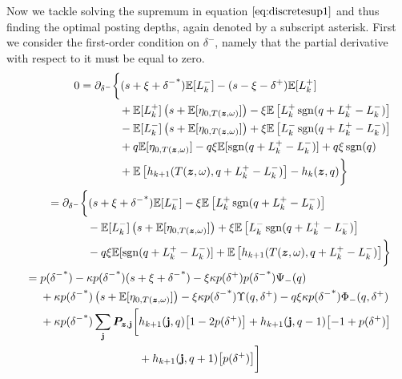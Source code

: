 Now we tackle solving the supremum in equation $\ref{eq:discretesup1}$ and thus finding the optimal posting depths, again denoted by a subscript asterisk. First we consider the first-order condition on $\delta^-$, namely that the partial derivative with respect to it must be equal to zero.
\begin{align}
\begin{split}
0 & = \partial_{\delta^-} \biggl\lbrace 
(s + \xi + {\delta^-}^*)\E [L_k^-] - (s - \xi - \delta^+)\E[L_k^+] \\
& \hphantom{\partial_{\delta^-} \biggl\lbrace {}+{}} + \E[L_k^+] \left( s + \E[\eta_{0,T(\bz, \omega)}] \right)  - \xi \E \left[L_k^+ \sgn( q + L_k^+ - L_k^-) \right] \\
& \hphantom{\partial_{\delta^-} \biggl\lbrace {}+{}} - \E[L_k^-] \left( s + \E[\eta_{0,T(\bz, \omega)}] \right) + \xi \E \left[ L_k^- \sgn( q + L_k^+ - L_k^-) \right] \\
& \hphantom{\partial_{\delta^-} \biggl\lbrace {}+{}} + q \E[ \eta_{0,T(\bz, \omega)}]  - q \xi \E[ \sgn( q + L_k^+ - L_k^-)] + q \xi \sgn(q)  \\
& \hphantom{\partial_{\delta^-} \biggl\lbrace {}+{}} + \E \left[ h_{k+1}(T(\bz,\omega), q + L_k^+ - L_k^- ) \right] -  h_k(\bz,q) \biggr\rbrace
\end{split} \\
\begin{split}
& = \partial_{\delta^-} \biggl\lbrace 
(s + \xi + {\delta^-}^*)\E [L_k^-] - \xi \E \left[L_k^+ \sgn( q + L_k^+ - L_k^-) \right] \\
& \hphantom{\partial_{\delta^-} \biggl\lbrace {}+{}} - \E[L_k^-] \left( s + \E[\eta_{0,T(\bz, \omega)}] \right) + \xi \E \left[ L_k^- \sgn( q + L_k^+ - L_k^-) \right] \\
& \hphantom{\partial_{\delta^-} \biggl\lbrace {}+{}} - q \xi \E[ \sgn( q + L_k^+ - L_k^-)]  + \E \left[ h_{k+1}(T(\bz,\omega), q + L_k^+ - L_k^- ) \right]  \biggr\rbrace
\end{split} \\
\begin{split}
& = p({\delta^-}^*) - \kappa p({\delta^-}^*) (s + \xi + {\delta^-}^*) - \xi \kappa p(\delta^+)p({\delta^-}^*)\Psi_-(q) \\
& \hphantom{{}={}} + \kappa p({\delta^-}^*) \left( s + \E[\eta_{0,T(\bz, \omega)}] \right) - \xi \kappa p({\delta^-}^*) \Upsilon(q,\delta^+) - q \xi \kappa p({\delta^-}^*) \Phi_-(q,\delta^+) \\
& \hphantom{{}={}} + \kappa p({\delta^-}^*) \sum_\bj \bP_{\bz,\bj} \biggl[ h_{k+1}(\bj, q) \bigl[ 1 - 2 p(\delta^+) \bigr] + h_{k+1}(\bj, q-1) \bigl[-1 + p(\delta^+) \bigr] \\
& \hphantom{{}={} + \kappa p({\delta^-}^*) \sum_\bj \bP_{\bz,\bj} \biggl[} + h_{k+1}(\bj, q+1) \bigl[ p(\delta^+) \bigr] \biggr]
\end{split}
\end{align}
